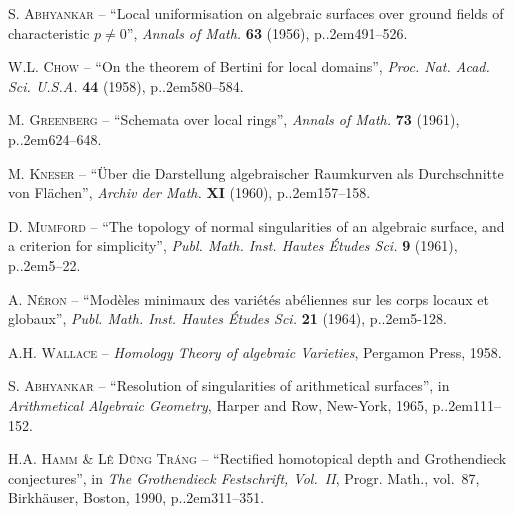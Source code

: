 \documentclass[11pt,a4paper,oneside]{book}
\providecommand{\sisi}[2]{#2}
\providecommand{\pageoriginale}{%
  \refstepcounter{pageoriginal}%
  \marginpar{\raggedright\footnotesize\bfseries\thepageoriginal}%
  \xspace}
\providecommand{\og}{``}
\providecommand{\fg}{''\xspace}
\providecommand{\ptbl}{.\kern.2em}
\providecommand{\No}{no.\kern.3em}
\theoremstyle{plain}
\theoremstyle{definition}
\theoremstyle{remark}
\begin{document}
\begin{thebibliography}{HL}\pageoriginale\label{XIII.7}

 \sisi{%
S. Abhyankar, Local uniformisation on algebraic surfaces, Annals of Math. vol.~63, \No~3, 1956}
{%
\textsc{S. Abhyankar} -- {\og Local uniformisation on algebraic surfaces over ground fields of characteristic $p\neq0$\fg}, \emph{Annals of Math.} \textbf{63} (1956), p\ptbl 491--526.
}

 \sisi{%
W.L. Chow, On the theorem of Bertini for local domains, Proc. Nat. Acad. Sc. Vol.~44, \No~6, pp\ptbl 580--584, 1958}
{%
\textsc{W.L. Chow} -- {\og On the theorem of Bertini for local domains\fg}, \emph{Proc. Nat. Acad. Sci. U.S.A.} \textbf{44} (1958), p\ptbl 580--584.
}

 \sisi{%
M. Greenberg, Schemata over local rings, Annals of Math., vol~73, 1961}
{%
\textsc{M. Greenberg} -- {\og Schemata over local rings\fg}, \emph{Annals of Math.} \textbf{73} (1961), p\ptbl 624--648.
}

 \sisi{%
M. Kneser, Uber die Darstellung algebraischer Raumkurven als Durchschnitte von Fl\"achen, Archiv der Math. Vol.~XI, fasc.~3, 1960}
{%
\textsc{M. Kneser} -- {\og \"Uber die Darstellung algebraischer Raumkurven als Durchschnitte von Fl\"achen\fg}, \emph{Archiv der Math.} \textbf{XI} (1960), p\ptbl 157--158.
}

 \sisi{%
D. Mumford, The topology of normal singularities of an algebraic surface, and a criterion for simplicity, Publications Math\'ematiques \No~9, 1961}
{%
\textsc{D. Mumford} -- {\og The topology of normal singularities of an algebraic surface, and a criterion for simplicity\fg}, \emph{Publ. Math. Inst. Hautes \'Etudes Sci.} \textbf{9} (1961), p\ptbl 5--22.
}

 \sisi{%
A. N\'eron, Mod\`eles minimaux des vari\'et\'es ab\'eliennes sur les corps locaux et globaux, to appear in Publications Math\'ematiques (available as mimeographed notes in limited circulation...)}
{%
\textsc{A. N\'eron} -- {\og Mod\`eles minimaux des vari\'et\'es ab\'eliennes sur les corps locaux et globaux\fg}, \emph{Publ. Math. Inst. Hautes \'Etudes Sci.} \textbf{21} (1964), p\ptbl 5-128.
}

 \sisi{%
A.H. Wallace, Homology Theory of algebraic Varieties, Pergamon Press, 1958.}
{%
\textsc{A.H. Wallace} -- \emph{Homology Theory of algebraic Varieties}, Pergamon Press, 1958.
}

 \sisi{%
S. Abhyankar, Resolution of singularities of arithmetical surfaces, p\ptbl 111--152, Arithmetical Algebraic Geometry, Harper and Row, New-York 1963.}
{%
\textsc{S. Abhyankar} -- {\og Resolution of singularities of arithmetical surfaces\fg}, in \emph{Arithmetical Algebraic Geometry}, Harper and Row, New-York, 1965, p\ptbl 111--152.
}

\sisi{}{%
\textsc{H.A. Hamm \& L\^e D\~ung Tr\'ang} -- {\og Rectified homotopical depth and Grothendieck conjectures\fg}, in \emph{The Grothendieck Festschrift, Vol.~II}, Progr. Math., vol.~87, Birkhäuser, Boston, 1990, p\ptbl 311--351.
}
\end{thebibliography}
\end{document}
